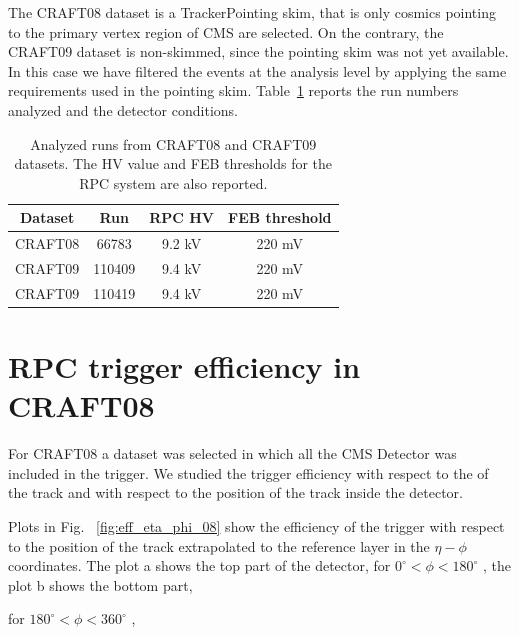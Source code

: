 The CRAFT08 dataset is a TrackerPointing skim, that is 
only cosmics pointing to the primary vertex 
region of CMS are selected. 
On the contrary, the CRAFT09 dataset is non-skimmed, 
since the pointing skim was not yet 
available. In this case we have filtered the 
events at the analysis level by applying the same
requirements used in the pointing skim.
Table~\ref{tab:runs} reports the run numbers analyzed and the detector
conditions.

 \begin{table}[htb]
    \label{tab:runs}
    \begin{center}
      \begin{tabular}{|c|c|c|c|} \hline
Dataset & Run   & RPC HV & FEB threshold \\ \hline
CRAFT08 & 66783 & 9.2 kV & 220 mV \\ \hline
CRAFT09 & 110409  & 9.4 kV & 220 mV \\ \hline
CRAFT09 & 110419  & 9.4 kV & 220 mV \\ \hline
      \end{tabular}
      \caption{Analyzed runs from CRAFT08 
and CRAFT09 datasets. The HV value and FEB thresholds for
the RPC system are also reported.}
    \end{center}
  \end{table}

\section{RPC trigger efficiency in CRAFT08}
For CRAFT08 a dataset was selected in which all the CMS Detector
 was included in the trigger. We studied the trigger efficiency 
with respect to the \pt of the track and with respect to the position 
of the track inside the detector.

Plots in Fig. ~\ref{fig:eff_eta_phi_08} show the efficiency of the trigger with respect to the 
position of the track extrapolated to the reference layer in the $\eta - \phi$
coordinates. The plot a shows the top part of the detector,
for $ 0^\circ < \phi < 180^\circ $ , 
the plot b shows the bottom part,

for  $ 180^\circ < \phi < 360^\circ $ , 


